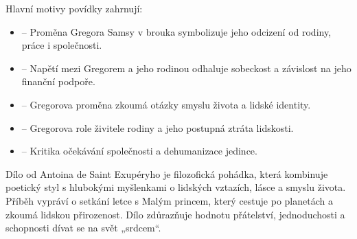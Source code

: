 \documentclass{article}
\begin{document}
\begin{mdframed}[backgroundcolor=DP,
	linecolor=WPP,
	linewidth=2pt,
	innertopmargin=5pt,
	innerbottommargin=5pt,
	innerleftmargin=5pt,
	innerrightmargin=5pt]\color{white}	
\par
Hlavní motivy povídky  zahrnují:
\begin{itemize}[leftmargin=*]\setlength\itemsep{-12pt}
	\item {} -- Proměna Gregora Samsy v brouka symbolizuje jeho odcizení od rodiny, práce i společnosti. \\
	\item {} -- Napětí mezi Gregorem a jeho rodinou odhaluje sobeckost a závislost na jeho finanční podpoře. \\
	\item {} -- Gregorova proměna zkoumá otázky smyslu života a lidské identity. \\
	\item {} -- Gregorova role živitele rodiny a jeho postupná ztráta lidskosti. \\
	\item {} -- Kritika očekávání společnosti a dehumanizace jedince.
\end{itemize}
\end{mdframed}\vspace{-2pt}

\begin{mdframed}[backgroundcolor=DP,
	linecolor=WPP,
	linewidth=2pt,
	innertopmargin=5pt,
	innerbottommargin=5pt,
	innerleftmargin=5pt,
	innerrightmargin=5pt]\color{white}	
\par
Dílo  od Antoina de Saint Exupéryho je filozofická pohádka, která kombinuje poetický styl s hlubokými myšlenkami o lidských vztazích, lásce a smyslu života. Příběh vypráví o setkání letce s Malým princem, který cestuje po planetách a zkoumá lidskou přirozenost. Dílo zdůrazňuje hodnotu přátelství, jednoduchosti a schopnosti dívat se na svět „srdcem“.
\end{mdframed}\vspace{-2pt}
\end{document}
